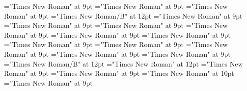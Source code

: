 \documentclass[gps1,twoside]{article}
\begin{document}
\font\nontrivialentryrootnontrivialentryrootnontrivialentryrootsvisiblecomplexformbackrefvisiblecomplexformbackrefssensesensessensesensessubentrysubentriesentrybefore="Times New Roman" at 9pt
\font\nontrivialentryrootsvisiblecomplexformbackrefvisiblecomplexformbackrefssensesensessensesensessubentrysubentriesentrybefore="Times New Roman" at 9pt
\font\nontrivialentryrootsvisiblecomplexformbackrefvisiblecomplexformbackrefssensesensessensesensessubentrysubentriesentryafter="Times New Roman" at 9pt
\font\nontrivialentryrootnontrivialentryrootsvisiblecomplexformbackrefvisiblecomplexformbackrefssensesensessensesensessubentrysubentriesentry="Times New Roman/B" at 12pt
\font\complexformsnotsubentrycomplexformsnotsubentrycomplexformsnotsubentriessubentrysubentriesentrybefore="Times New Roman" at 9pt
\font\complexformsnotsubentriessubentrysubentriesentryafter="Times New Roman" at 9pt
\font\complexformtypescomplexformsnotsubentrycomplexformsnotsubentriessubentrysubentriesentryafter="Times New Roman" at 9pt
\font\reverseabbrcomplexformtypecomplexformtypescomplexformsnotsubentrycomplexformsnotsubentriessubentrysubentriesentrybefore="Times New Roman" at 9pt
\font\headwordcomplexformsnotsubentrycomplexformsnotsubentriessubentrysubentriesentrybefore="Times New Roman" at 9pt
\font\owningentrysummarydefinitioncomplexformsnotsubentrycomplexformsnotsubentriessubentrysubentriesentrybefore="Times New Roman" at 9pt
\font\spanowningentrysummarydefinitioncomplexformsnotsubentrycomplexformsnotsubentriessubentrysubentriesentryfirstchildbefore="Times New Roman" at 9pt
\font\spanowningentrysummarydefinitioncomplexformsnotsubentrycomplexformsnotsubentriessubentrysubentriesentrylastchildafter="Times New Roman" at 9pt
\font\nontrivialentryrootnontrivialentryrootnontrivialentryrootscomplexformsnotsubentrycomplexformsnotsubentriessubentrysubentriesentrybefore="Times New Roman" at 9pt
\font\nontrivialentryrootscomplexformsnotsubentrycomplexformsnotsubentriessubentrysubentriesentrybefore="Times New Roman" at 9pt
\font\nontrivialentryrootscomplexformsnotsubentrycomplexformsnotsubentriessubentrysubentriesentryafter="Times New Roman" at 9pt
\font\nontrivialentryrootnontrivialentryrootscomplexformsnotsubentrycomplexformsnotsubentriessubentrysubentriesentry="Times New Roman/B" at 12pt
\font\picturepicturessubentrysubentriesentry="Times New Roman" at 12pt
\font\picturessubentrysubentriesentrybefore="Times New Roman" at 9pt
\font\picturessubentrysubentriesentryafter="Times New Roman" at 9pt
\font\picturepicturessubentrysubentriesentry="Times New Roman" at 10pt
\font\picturepicturessubentrysubentriesentryafter="Times New Roman" at 9pt
\end{document}
